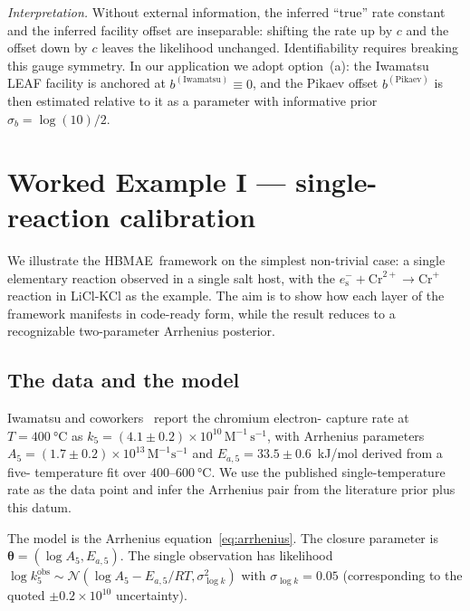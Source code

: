 \documentclass[12pt]{article}
\theoremstyle{plain}
\theoremstyle{definition}
\theoremstyle{remark}
\newcommand{\eS}{\ensuremath{e_{\mathrm{s}}^{-}}\xspace}
\newcommand{\HBMAE}{HBMAE\xspace}
\begin{document}
\emph{Interpretation.}  Without external information, the
inferred ``true'' rate constant and the inferred facility offset are
inseparable:  shifting the rate up by $c$ and the offset down by $c$ leaves
the likelihood unchanged.  Identifiability requires breaking this gauge
symmetry.  In our application we adopt option~(a):  the Iwamatsu LEAF
facility is anchored at $b^{(\mathrm{Iwamatsu})}\equiv 0$, and the Pikaev
offset $b^{(\mathrm{Pikaev})}$ is then estimated relative to it as a
parameter with informative prior $\sigma_b = \log(10)/2$.

\section{Worked Example I --- single-reaction calibration}\label{sec:worked1}

We illustrate the \HBMAE\ framework on the simplest non-trivial case:  a
single elementary reaction observed in a single salt host, with the
$\eS+\mathrm{Cr}^{2+}\to\mathrm{Cr}^+$ reaction in LiCl-KCl as the example.
The aim is to show how each layer of the framework manifests in code-ready
form, while the result reduces to a recognizable two-parameter Arrhenius
posterior.

\subsection{The data and the model}\label{sec:worked1:setup}

Iwamatsu and coworkers~\citep{Iwamatsu2026} report the chromium electron-
capture rate at $T = \SI{400}{\celsius}$ as
$k_5 = (4.1\pm 0.2)\times 10^{10}\,\mathrm{M}^{-1}\,\mathrm{s}^{-1}$, with
Arrhenius parameters $A_5 = (1.7\pm 0.2)\times 10^{13}\,\mathrm{M}^{-1}
\mathrm{s}^{-1}$ and $E_{a,5} = 33.5\pm 0.6$~kJ/mol derived from a five-
temperature fit over $400$--$\SI{600}{\celsius}$.  We use the published
single-temperature rate as the data point and infer the Arrhenius pair from
the literature prior plus this datum.

The model is the Arrhenius equation~\eqref{eq:arrhenius}.  The closure
parameter is $\boldsymbol\theta = (\log A_5, E_{a,5})$.  The single
observation has likelihood
$\log k_5^{\mathrm{obs}} \sim \mathcal{N}(\log A_5 - E_{a,5}/RT,
\sigma_{\log k}^2)$ with $\sigma_{\log k} = 0.05$ (corresponding to the
quoted $\pm 0.2\times 10^{10}$ uncertainty).
\end{document}
